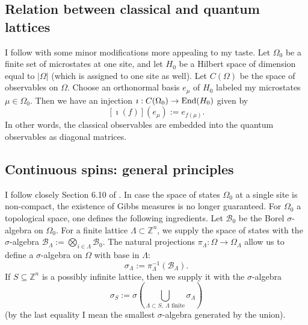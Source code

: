 \subsection{Relation between classical and quantum lattices}
I follow \cite{israel} with some minor modifications more appealing to my taste. Let $\Omega_0$ be a finite set of microstates at one site, and let $H_0$ be a Hilbert space of dimension equal to $|\Omega|$ (which is assigned to one site as well). Let $C(\Omega)$ be the space of observables on $\Omega$. Choose an orthonormal basis $e_{\mu}$ of $H_0$ labeled my microstates $\mu \in \Omega_0$. Then we have an injection $\imath : C(\Omega_0) \rightarrow \operatorname{End}(H_0)$ given by
\[
[\imath(f)](e_{\mu}) := e_{f(\mu)}.
\]
In other words, the classical observables are embedded into the quantum observables as diagonal matrices.

\subsection{Continuous spins: general principles}\label{ss:gen_princ}
I follow closely Section 6.10 of \cite{friedli}. In case the space of states $\Omega_0$ at a single site is non-compact, the existence of Gibbs measures is no longer guaranteed. For $\Omega_0$ a topological space, one defines the following ingredients. Let $\mathcal B_0$ be the Borel $\sigma$-algebra on $\Omega_0$. For a finite lattice $\Lambda \subset \mathbb Z^n$, we supply the space of states with the $\sigma$-algebra $\mathcal B_{\Lambda} := \bigotimes_{i \in \Lambda} \mathcal B_0$. The natural projections $\pi_{\Lambda} : \Omega \rightarrow \Omega_{\Lambda}$ allow us to define a $\sigma$-algebra on $\Omega$ with base in $\Lambda$:
\[
\sigma_{\Lambda} := \pi^{-1}_{\Lambda}(\mathcal B_{\Lambda}).
\]
If $S \subseteq \mathbb Z^n$ is a possibly infinite lattice, then we supply it with the $\sigma$-algebra
\[
\sigma_{S} := \sigma(\bigcup_{\Lambda \subset S, \ \Lambda \text{ finite}} \sigma_{\Lambda})
\]
(by the last equality I mean the smallest $\sigma$-algebra generated by the union).